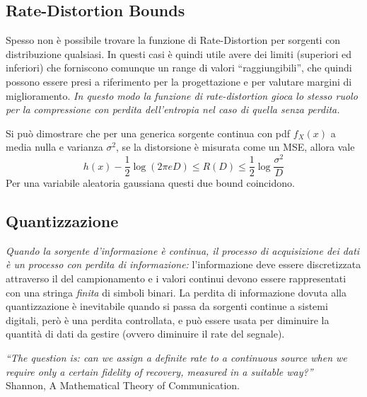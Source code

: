 \subsection{Rate-Distortion Bounds}
Spesso non è possibile trovare la funzione di Rate-Distortion per sorgenti con distribuzione qualsiasi. In questi casi è quindi utile avere dei limiti (superiori ed inferiori) che forniscono comunque un range di valori “raggiungibili”, che quindi possono essere presi a riferimento per la progettazione e per valutare margini di miglioramento. \emph{In questo modo la funzione di rate-distortion gioca lo stesso ruolo per la compressione con perdita dell’entropia nel caso di quella senza perdita.}

Si può dimostrare che per una generica sorgente continua con pdf $f_X(x)$ a media nulla e varianza $\sigma^2$, se la distorsione \`e misurata come un MSE, allora vale
\begin{equation}
    h(x) - \frac{1}{2} \log (2\pi e D) \leq R(D) \leq \frac{1}{2} \log \frac{\sigma^2}{D}
\end{equation}
Per una variabile aleatoria gaussiana questi due bound coincidono.
\subsection{Quantizzazione}
\textit{Quando la sorgente d’informazione è continua, il processo di acquisizione dei dati è un processo con perdita di informazione:} l’informazione deve essere discretizzata attraverso il del campionamento e i valori continui devono essere rappresentati con una stringa \textit{finita} di simboli binari. La perdita di informazione dovuta alla quantizzazione è inevitabile quando si passa da sorgenti continue a sistemi digitali, però è una perdita controllata, e può essere usata per diminuire la quantità di dati da gestire (ovvero diminuire il rate del segnale).

\begin{center}
\emph{“The question is: can we assign a definite rate to a continuous source when we require only a certain fidelity of recovery, measured in a suitable way?”}\\
Shannon, A Mathematical Theory of Communication.
\end{center}

